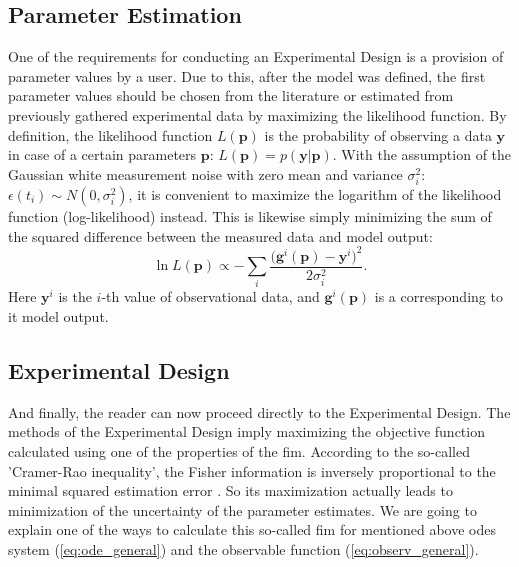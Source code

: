 \documentclass[10pt,A4paper]{article}
\newcommand{\mbp}{\mathbf{p}}
\newcommand{\mby}{\mathbf{y}}
\begin{document}
\subsection*{Parameter Estimation}
One of the requirements for conducting an Experimental Design is a provision of parameter values by a user.
Due to this, after the model was defined, the first parameter values should be chosen from the literature or estimated from previously gathered experimental data by maximizing the likelihood function.
By definition, the likelihood function $L(\mbp)$ is the probability of observing a data $\mby$ in case of a certain parameters $\mbp$: $L(\mbp) = p(\mby|\mbp)$.
With the assumption of the Gaussian white measurement noise with zero mean and variance $\sigma_i^2$: $\epsilon(t_i) \sim N(0, \sigma_i^2)$, it is convenient to maximize the logarithm of the likelihood function (log-likelihood) instead.
This is likewise simply minimizing the sum of the squared difference between the measured data and model output:
\begin{equation}
    \ln L(\mbp) \propto - \sum_{i}\frac{ \big(\mathbf{g}^{i}(\mbp) - \mby^{i}\big)^2}{2 \sigma_{i}^2}.
    \label{eq:likelihood_Gaussian}
\end{equation}
Here $\mby^{i}$ is the $i$-th value of observational data, and $\mathbf{g}^{i}(\mbp)$ is a corresponding to it model output.
%
\subsection*{Experimental Design}
And finally, the reader can now proceed directly to the Experimental Design.
The methods of the Experimental Design imply maximizing the objective function calculated using one of the properties of the \ac{fim}.
According to the so-called 'Cramer-Rao inequality', the Fisher information is inversely proportional to the minimal squared estimation error \cite{friedenExploratoryData2010}. 
So its maximization actually leads to minimization of the uncertainty of the parameter estimates.
We are going to explain one of the ways to calculate this so-called \acl{fim} for mentioned above \acp{ode} system (\ref{eq:ode_general}) and the observable function (\ref{eq:observ_general}).
%
\end{document}
